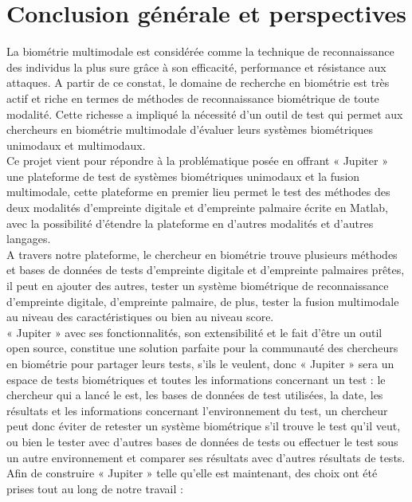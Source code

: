 \chapter*{Conclusion générale et perspectives}
\tab La biométrie multimodale est considérée comme la technique de reconnaissance des individus la plus sure grâce à son efficacité, performance et résistance aux attaques. A partir de ce constat, le domaine de recherche en biométrie est très actif et riche en termes de méthodes de reconnaissance biométrique de toute modalité. Cette richesse a impliqué la nécessité d’un outil de test qui permet aux chercheurs en biométrie multimodale d’évaluer leurs systèmes biométriques unimodaux et multimodaux. \\ \tab
Ce projet vient pour répondre à la problématique posée en offrant « Jupiter » une plateforme de test de systèmes biométriques unimodaux et la fusion multimodale, cette plateforme en premier lieu permet le test des méthodes des deux modalités d’empreinte digitale et d’empreinte palmaire écrite en Matlab, avec la possibilité d’étendre la plateforme en d’autres modalités et d’autres langages. \\ \tab
A travers notre plateforme, le chercheur en biométrie trouve plusieurs méthodes et bases de données de tests d’empreinte digitale et d’empreinte palmaires prêtes, il peut en ajouter des autres, tester un système biométrique de reconnaissance d’empreinte digitale, d’empreinte palmaire, de plus, tester la fusion multimodale au niveau des caractéristiques ou bien au niveau score. \\ \tab
« Jupiter » avec ses fonctionnalités, son extensibilité et le fait d’être un outil open source, constitue une solution parfaite pour la communauté des chercheurs en biométrie pour partager leurs tests, s’ils le veulent, donc « Jupiter » sera un espace de tests biométriques et toutes les informations concernant un test : le chercheur qui a lancé le est, les bases de données de test utilisées, la date, les résultats et les informations concernant l’environnement du test, un chercheur peut donc éviter de retester un système biométrique s’il trouve le test qu’il veut, ou bien le tester avec d’autres bases de données de tests ou effectuer le test sous un autre environnement et comparer ses résultats avec d’autres résultats de tests. \\ \tab
Afin de construire « Jupiter » telle qu’elle est maintenant, des choix ont été prises tout au long de notre travail :
